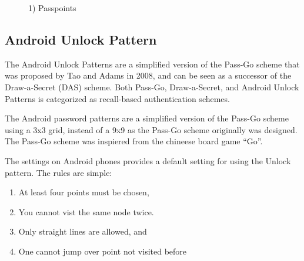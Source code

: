       \begin{figure}[H]
        \centering
        \caption{1) Passpoints}
      \end{figure}

  \subsection{Android Unlock Pattern}


    The Android Unlock Patterns are a simplified version of the Pass-Go scheme that was proposed by 
    Tao and Adams in 2008, and can be seen as a successor of the Draw-a-Secret (DAS) scheme.
    Both Pass-Go, Draw-a-Secret, and Android Unlock Patterns is categorized as recall-based authentication schemes.

    The Android password patterns are a simplified version of the Pass-Go scheme using a 3x3 grid, instead of a 9x9 as 
    the Pass-Go scheme originally was designed. The Pass-Go scheme was inspiered from the chineese board game ``Go''.

    The settings on Android phones provides a default setting for using the Unlock pattern. 
    The rules are simple: 
        \begin{enumerate}
            \item At least four points must be chosen,
            \item You cannot vist the same node twice.
            \item Only straight lines are allowed, and
            \item One cannot jump over point not visited before
        \end{enumerate}

